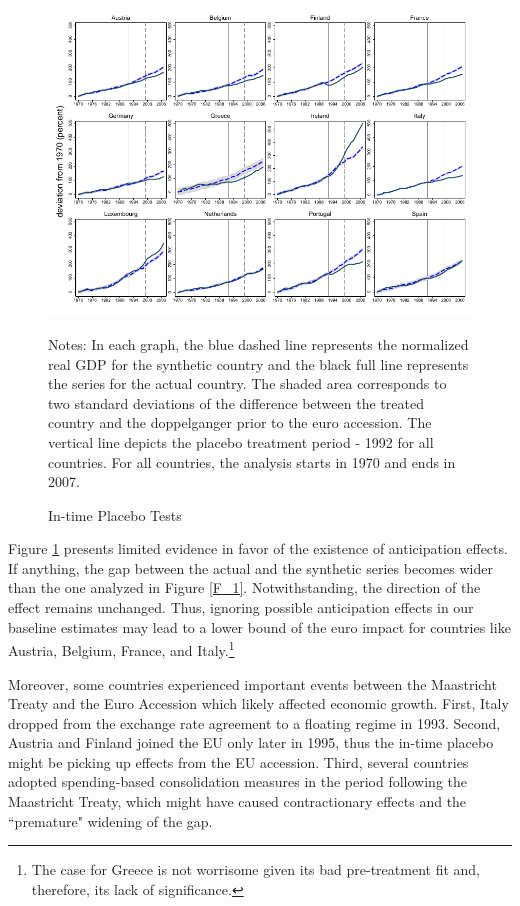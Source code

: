 \documentclass[12pt]{article}
\newcommand{\annote}[1]{\parbox{\textwidth}{\renewcommand{\baselinestretch}{1.0}\vspace{12pt} \small Notes: #1}}
\begin{document}
\begin{figure}[h!]
    \centering
    \caption{In-time Placebo Tests}
    \includegraphics[scale=1.2]{Output/Figures/SCM_gdp_Rob_1992_Annual.pdf}
    \annote{In each graph, the blue dashed line represents the normalized real GDP for the synthetic country and the black full line represents the series for the actual country. The shaded area corresponds to two standard deviations of the difference between the treated country and the doppelganger prior to the euro accession. The vertical line depicts the placebo treatment period - 1992 for all countries. For all countries, the analysis starts in 1970 and ends in 2007. %
    }
    \label{F_Maastricht}
\end{figure}

Figure \ref{F_Maastricht} presents limited evidence in favor of the existence of anticipation effects. If anything, the gap between the actual and the synthetic series becomes wider than the one analyzed in Figure \ref{F_1}. Notwithstanding, the direction of the effect remains unchanged. Thus, ignoring possible anticipation effects in our baseline estimates may lead to a lower bound of the euro impact for countries like Austria, Belgium, France, and Italy.\footnote{The case for Greece is not worrisome given its bad pre-treatment fit and, therefore, its lack of significance.} 

Moreover, some countries experienced important events between the Maastricht Treaty and the Euro Accession which likely affected economic growth. First, Italy dropped from the exchange rate agreement to a floating regime in 1993. Second, Austria and Finland joined the EU only later in 1995, thus the in-time placebo might be picking up effects from the EU accession. Third, several countries adopted spending-based consolidation measures in the period following the Maastricht Treaty, which might have caused contractionary effects \citep{Gabriel2023} and the ``premature" widening of the gap.
\end{document}
